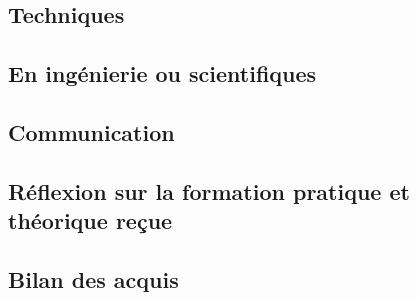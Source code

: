 \documentclass[12pt]{article} 	%
\begin{document}
\subsection{Techniques}

\subsection{En ingénierie ou scientifiques}

\subsection{Communication}

\subsection{Réflexion sur la formation pratique et théorique reçue}




\subsection{Bilan des acquis}
\end{document}
